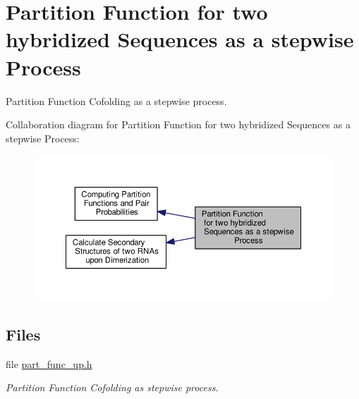 \hypertarget{group__up__cofold}{\section{Partition Function for two hybridized Sequences as a stepwise Process}
\label{group__up__cofold}
}


Partition Function Cofolding as a stepwise process.  


Collaboration diagram for Partition Function for two hybridized Sequences as a stepwise Process\-:
\nopagebreak
\begin{figure}[H]
\begin{center}
\leavevmode
\includegraphics[width=350pt]{group__up__cofold}
\end{center}
\end{figure}
\subsection*{Files}
\begin{DoxyCompactItemize}
\item 
file \hyperlink{part__func__up_8h}{part\-\_\-func\-\_\-up.\-h}
\begin{DoxyCompactList}\small\item\em Partition Function Cofolding as stepwise process. \end{DoxyCompactList}\end{DoxyCompactItemize}
